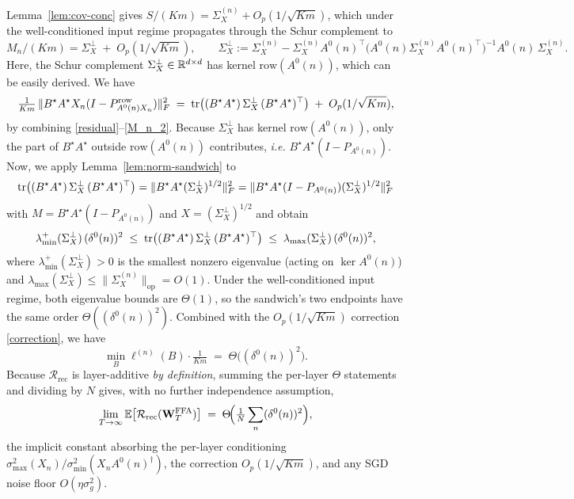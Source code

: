 Lemma~\ref{lem:cov-conc} gives $S/(Km) = \Sigma_X^{(n)} + O_p(1/\sqrt{Km})$, which under the well-conditioned input regime propagates through the Schur complement to
\begin{equation} \label{M_n_2}
M_n/(Km) =\Sigma_X^\perp \;+\; O_p(1/\sqrt{Km}), \qquad \Sigma_X^\perp :=\Sigma_X^{(n)} - \Sigma_X^{(n)} A^0(n)^\top\bigl(A^0(n)\Sigma_X^{(n)} A^0(n)^\top\bigr)^{-1} A^0(n)\,\Sigma_X^{(n)}.
\end{equation}
Here, the Schur complement $\Sigma_X^\perp\in\mathbb{R}^{d\times d}$ has kernel $\mathrm{row}(A^0(n))$, which can be easily derived. We have 
\begin{equation} \label{correction}
\tfrac{1}{Km}\,\|B^\star A^\star X_n(I-P^\text{row}_{A^0(n)X_n})\|_F^2 \;=\; \mathrm{tr}\bigl((B^\star A^\star)\,\Sigma_X^\perp\,(B^\star A^\star)^\top\bigr) \;+\; O_p(1/\sqrt{Km}),
\end{equation}
by combining \eqref{residual}--\eqref{M_n_2}.
Because $\Sigma_X^\perp$ has kernel $\mathrm{row}(A^0(n))$, only the part of $B^\star A^\star$ outside $\mathrm{row}(A^0(n))$ contributes, \emph{i.e.} $B^\star A^\star(I-P_{A^0(n)})$. Now, we apply Lemma~\ref{lem:norm-sandwich} to
\begin{equation}
\mathrm{tr}\bigl((B^\star A^\star)\,\Sigma_X^\perp\,(B^\star A^\star)^\top\bigr)= \|B^\star A^\star (\Sigma_X^\perp)^{1/2}\|_F^2=
\|B^\star A^\star(I-P_{A^0(n)}) (\Sigma_X^\perp)^{1/2}\|_F^2
\end{equation}
with $M= B^\star A^\star(I-P_{A^0(n)})$ and $X = (\Sigma_X^\perp)^{1/2}$ and obtain
\begin{equation}
\lambda_{\min}^+(\Sigma_X^\perp)\,(\delta^0(n))^2 \;\le\; \mathrm{tr}\bigl((B^\star A^\star)\,\Sigma_X^\perp\,(B^\star A^\star)^\top\bigr) \;\le\; \lambda_{\max}(\Sigma_X^\perp)\,(\delta^0(n))^2,
\end{equation}
where $\lambda_{\min}^+(\Sigma_X^\perp) > 0$ is the smallest nonzero eigenvalue (acting on $\ker A^0(n)$) and $\lambda_{\max}(\Sigma_X^\perp) \le \|\Sigma_X^{(n)}\|_\text{op} = O(1)$. Under the well-conditioned input regime, both eigenvalue bounds are $\Theta(1)$, so the sandwich's two endpoints have the same order $\Theta((\delta^0(n))^2)$. Combined with the $O_p(1/\sqrt{Km})$ correction \eqref{correction}, we have
\begin{equation}
    \min_B \ell^{(n)}(B)\cdot\tfrac{1}{Km} \;=\; \Theta\bigl((\delta^0(n))^2\bigr).
\end{equation}
Because $\mathcal R_\text{rec}$ is layer-additive \emph{by definition}, summing the per-layer $\Theta$ statements and dividing by $N$ gives, with no further independence assumption,
\begin{equation}
\lim_{T\to\infty}\mathbb{E}\bigl[\mathcal R_\text{rec}(\mathbf W_T^\text{FFA})\bigr] \;=\; \Theta\!\Bigl(\tfrac{1}{N}\sum_n (\delta^0(n))^2\Bigr),    
\end{equation}
the implicit constant absorbing the per-layer conditioning $\sigma_{\max}^2(X_n)/\sigma_{\min}^2(X_n A^0(n)^\dagger)$, the correction $O_p(1/\sqrt{Km})$, and any SGD noise floor $O(\eta\sigma_g^2)$. 

